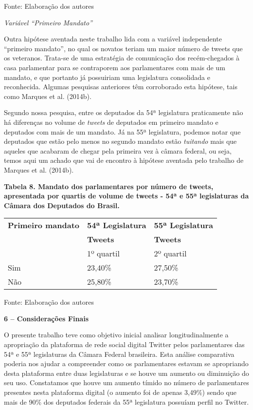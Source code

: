 Fonte: Elaboração dos autores

\emph{Variável ``Primeiro Mandato''}

Outra hipótese aventada neste trabalho lida com a variável independente
``primeiro mandato'', no qual os novatos teriam um maior número de
tweets que os veteranos. Trata-se de uma estratégia de comunicação dos
recém-chegados à casa parlamentar para se contraporem aos parlamentares
com mais de um mandato, e que portanto já possuiriam uma legislatura
consolidada e reconhecida. Algumas pesquisas anteriores têm corroborado
esta hipótese, tais como Marques et al. (2014b).

Segundo nossa pesquisa, entre os deputados da 54ª legislatura
praticamente não há diferenças no volume de \emph{tweets} de deputados
em primeiro mandato e deputados com mais de um mandato. Já na 55ª
legislatura, podemos notar que deputados que estão pelo menos no segundo
mandato estão \emph{tuitando} mais que aqueles que acabaram de chegar
pela primeira vez à câmara federal, ou seja, temos aqui um achado que
vai de encontro à hipótese aventada pelo trabalho de Marques et al.
(2014b).

\textbf{Tabela 8. Mandato dos parlamentares por número de tweets,
apresentada por quartis de volume de tweets - 54ª e 55ª legislaturas da
Câmara dos Deputados do Brasil.}

\begin{longtable}[]{@{}lll@{}}
\toprule
\textbf{Primeiro mandato} & \textbf{54ª Legislatura} & \textbf{55ª
Legislatura}\tabularnewline
& \textbf{Tweets} & \textbf{Tweets}\tabularnewline
& 1º quartil & 2º quartil\tabularnewline
Sim & 23,40\% & 27,50\%\tabularnewline
Não & 25,80\% & 23,70\%\tabularnewline
\bottomrule
\end{longtable}

Fonte: Elaboração dos autores

\textbf{6 -- Considerações Finais }

O presente trabalho teve como objetivo inicial analisar
longitudinalmente a apropriação da plataforma de rede social digital
Twitter pelos parlamentares das 54ª e 55ª legislaturas da Câmara Federal
brasileira. Esta análise comparativa poderia nos ajudar a compreender
como os parlamentares estavam se apropriando desta plataforma entre duas
legislaturas e se houve um aumento ou diminuição do seu uso. Constatamos
que houve um aumento tímido no número de parlamentares presentes nesta
plataforma digital (o aumento foi de apenas 3,49\%) sendo que mais de
90\% dos deputados federais da 55ª legislatura possuíam perfil no
Twitter.


